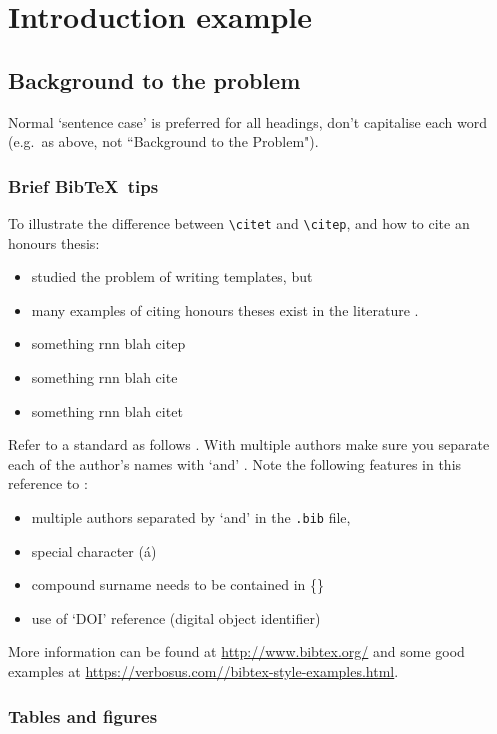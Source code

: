 \chapter{Introduction example}

\section{Background to the problem}

Normal `sentence case' is preferred for all headings, don't capitalise each word (e.g.~as above, not ``Background to the Problem").

\subsection{Brief Bib\TeX\ tips}

To illustrate the difference between \verb|\citet| and \verb|\citep|, and how to cite an honours thesis:
\begin{itemize}
  \item \citet{Smith} studied the problem of writing templates, but
  \item many examples of citing honours theses exist in the literature \citep{Smith}.
  \item something rnn \citep{Marino2016} blah citep
  \item something rnn \cite{Marino2016} blah cite
  \item something rnn \citet{Marino2016} blah citet
\end{itemize}
Refer to a standard as follows \citep{ISO3382-2}. With multiple authors make sure you separate each of the author's names with `and' \citep{BookExample}. Note the following features in this reference to \citet{vonKarman}:
\begin{itemize}
  \item multiple authors separated by `and' in the {\tt .bib} file,
  \item special character (\'a)
  \item compound surname needs to be contained in \{\}
  \item use of `DOI' reference (digital object identifier)  
\end{itemize}

More information can be found at \url{http://www.bibtex.org/} and some good examples at \url{https://verbosus.com//bibtex-style-examples.html}.

\subsection{Tables and figures}

